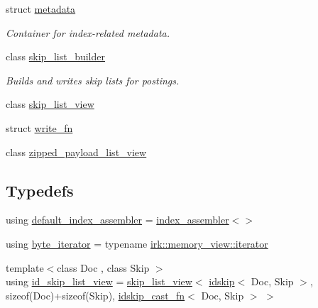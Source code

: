 \begin{DoxyCompactItemize}
\item 
struct \mbox{\hyperlink{structirk_1_1index_1_1metadata}{metadata}}
\begin{DoxyCompactList}\small\item\em Container for index-\/related metadata. \end{DoxyCompactList}\item 
class \mbox{\hyperlink{classirk_1_1index_1_1skip__list__builder}{skip\+\_\+list\+\_\+builder}}
\begin{DoxyCompactList}\small\item\em Builds and writes skip lists for postings. \end{DoxyCompactList}\item 
class \mbox{\hyperlink{classirk_1_1index_1_1skip__list__view}{skip\+\_\+list\+\_\+view}}
\item 
struct \mbox{\hyperlink{structirk_1_1index_1_1write__fn}{write\+\_\+fn}}
\item 
class \mbox{\hyperlink{classirk_1_1index_1_1zipped__payload__list__view}{zipped\+\_\+payload\+\_\+list\+\_\+view}}
\end{DoxyCompactItemize}
\subsection*{Typedefs}
\begin{DoxyCompactItemize}
\item 
using \mbox{\hyperlink{namespaceirk_1_1index_a0f1c105dfd7dd3ada51c4c2eb2b6850e}{default\+\_\+index\+\_\+assembler}} = \mbox{\hyperlink{classirk_1_1index_1_1index__assembler}{index\+\_\+assembler}}$<$$>$
\item 
using \mbox{\hyperlink{namespaceirk_1_1index_a4089fad8418d09bec3dd2a7ff91d1cea}{byte\+\_\+iterator}} = typename \mbox{\hyperlink{classirk_1_1memory__view_1_1iterator}{irk\+::memory\+\_\+view\+::iterator}}
\item 
{\footnotesize template$<$class Doc , class Skip $>$ }\\using \mbox{\hyperlink{namespaceirk_1_1index_ab41287bdb0b0d461d4aa1ec2bda99ddc}{id\+\_\+skip\+\_\+list\+\_\+view}} = \mbox{\hyperlink{classirk_1_1index_1_1skip__list__view}{skip\+\_\+list\+\_\+view}}$<$ \mbox{\hyperlink{structirk_1_1index_1_1idskip}{idskip}}$<$ Doc, Skip $>$, sizeof(Doc)+sizeof(Skip), \mbox{\hyperlink{structirk_1_1index_1_1idskip__cast__fn}{idskip\+\_\+cast\+\_\+fn}}$<$ Doc, Skip $>$ $>$
\end{DoxyCompactItemize}
